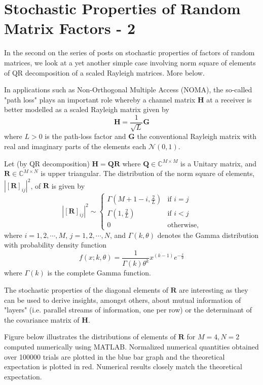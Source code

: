 \section{Stochastic Properties of Random Matrix Factors - 2}

In the second on the series of posts on stochastic properties of factors of random matrices, we look at a yet another simple case involving norm square of elements of QR decomposition of a scaled Rayleigh matrices. More below.

In applications such as Non-Orthogonal Multiple Access (NOMA), the so-called "path loss" plays an important role whereby a channel matrix $\mathbf{H}$ at a receiver is better modelled as a scaled Rayleigh matrix given by $$\mathbf{H} = \frac{1}{\sqrt{L}} \mathbf{G}$$ where $L > 0$ is the path-loss factor and $\mathbf{G}$ the conventional Rayleigh matrix with real and imaginary parts of the elements each $\mathcal{N}(0,1)$.

Let (by QR decomposition) $\mathbf{H} = \mathbf{Q}\mathbf{R}$ where $\mathbf{Q} \in \mathbb{C}^{M\times M}$ is a Unitary matrix, and $\mathbf{R} \in \mathbb{C}^{M\times N}$ is upper triangular. The distribution of the norm square of elements, $|[\mathbf{R}]_{ij}|^2$, of $\mathbf{R}$ is given by $$|[\mathbf{R}]_{ij}|^2 \sim \begin{cases} \Gamma(M+1-i,\frac{2}{L}) & \text{if $i = j$} \\ \Gamma(1,\frac{2}{L}) & \text{if $i < j$} \\ 0 & \text{otherwise,} \end{cases}$$ where $i=1,2,\cdots,M$, $j=1,2,\cdots,N$, and $\Gamma(k,\theta)$ denotes the Gamma distribution with probability density function $$f(x; k,\theta) = \frac{1}{\Gamma(k)\theta^k}x^{(k-1)}e^{-\frac{x}{\theta}}$$ where $\Gamma(k)$ is the complete Gamma function.

The stochastic properties of the diagonal elements of $\mathbf{R}$ are interesting as they can be used to derive insights, amongst others, about mutual information of "layers" (i.e. parallel streams of information, one per row) or the determinant of the covariance matrix of $\mathbf{H}$.

Figure below illustrates the distributions of elements of $\mathbf{R}$ for $M=4, N=2$ computed numerically using MATLAB. Normalized numerical quantities obtained over 100000 trials are plotted in the blue bar graph and the theoretical expectation is plotted in red. Numerical results closely match the theoretical expectation.

